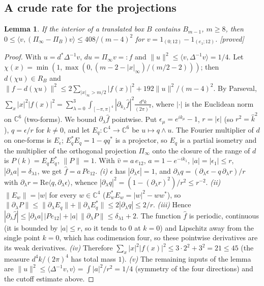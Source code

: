 \documentclass[11pt,a4paper]{article}
\theoremstyle{plain}
\newtheorem{lemma}[theorem]{Lemma}
\theoremstyle{definition}
\theoremstyle{remark}
\numberwithin{equation}{section}
\newcommand{\st}[1]{\textsf{[#1]}}
\begin{document}
\subsection{A crude rate for the projections}
\begin{lemma}\label{lem:projrate}
If the interior of a translated box $B$ contains $B_{m-1}$, $m\ge8$, then $0\le\langle v,(\Pi_\infty-\Pi_B)v\rangle\le408/(m-4)^2$ for
$v=1_{(0;12)}-1_{(e_1;12)}$. \st{proved}
\end{lemma}
\begin{proof}
With $u=d^*\Delta^{-1}v$, $du=\Pi_\infty v=:f$ and $\|u\|^2\le\langle v,\Delta^{-1}v\rangle=1/4$. Let $\chi(x)=\min(1,\max(0,(m-2-|x|_\infty)/(m/2-2)))$;
then $d(\chi u)\in R_B$ and
$\|f-d(\chi u)\|^2\le2\sum_{|x|_\infty>m/2}|f(x)|^2+192\|u\|^2/(m-4)^2$. By Parseval, $\sum_x|x|^2|f(x)|^2=\sum_{\lambda=0}^3\int_{[-\pi,\pi]^4}|\partial_{k_\lambda}\hat f|^2\frac{d^4k}{(2\pi)^4}$, where $|\cdot|$ is the Euclidean norm on $\mathbb C^6$ (two-forms).
We bound $\partial_\lambda\hat f$ pointwise. Put $\epsilon_\mu=e^{ik_\mu}-1$, $r=|\epsilon|$ (so $r^2=\hat k^2$), $q=\epsilon/r$ for $k\ne0$, and let $E_q:\mathbb C^4\to\mathbb C^6$ be $u\mapsto q\wedge u$. The Fourier multiplier of $d$ on one-forms is $E_\epsilon$; $E_q^*E_q=1-qq^*$ is a projector, so $E_q$ is a partial isometry
and the multiplier of the orthogonal projection $\Pi_\infty$ onto the closure of the range of $d$ is $P(k)=E_qE_q^*$, $\|P\|=1$. With $\hat v=a\,e_{12}$, $a=1-e^{-ik_1}$, $|a|=|\epsilon_1|\le r$, $|\partial_\lambda a|=\delta_{\lambda1}$, we get $\hat f=a\,Pe_{12}$.
\emph{(i)} $\epsilon$ has $|\partial_\lambda\epsilon|=1$, and $\partial_\lambda q=(\partial_\lambda\epsilon-q\,\partial_\lambda r)/r$ with $\partial_\lambda r=\mathrm{Re}\langle q,\partial_\lambda\epsilon\rangle$, whence $|\partial_\lambda q|^2=(1-(\partial_\lambda r)^2)/r^2\le r^{-2}$.
\emph{(ii)} $\|E_w\|=|w|$ for every $w\in\mathbb C^4$ ($E_w^*E_w=|w|^2-ww^*$), so $\|\partial_\lambda P\|\le\|\partial_\lambda E_q\|+\|\partial_\lambda E_q^*\|\le2|\partial_\lambda q|\le2/r$.
\emph{(iii)} Hence $|\partial_\lambda\hat f|\le|\partial_\lambda a|\,|Pe_{12}|+|a|\,\|\partial_\lambda P\|\le\delta_{\lambda1}+2$. The function $\hat f$ is periodic, continuous (it is bounded by $|a|\le r$, so it tends to $0$ at $k=0$) and Lipschitz away from the single point $k=0$, which has codimension four, so these pointwise derivatives are its weak derivatives.
\emph{(iv)} Therefore $\sum_x|x|^2|f(x)|^2\le3\cdot2^2+3^2=21\le45$ (the measure $d^4k/(2\pi)^4$ has total mass $1$).
\emph{(v)} The remaining inputs of the lemma are $\|u\|^2\le\langle\Delta^{-1}v,v\rangle=\int|a|^2/r^2=1/4$ (symmetry of the four directions) and the cutoff estimate above.

\end{proof}
\end{document}
